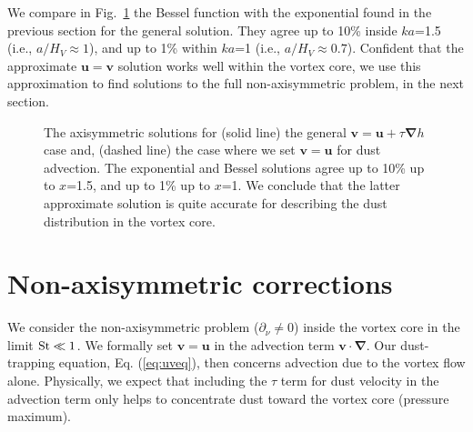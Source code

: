 \documentclass[apj]{emulateapj}
\renewcommand{\v}[1]{{\boldsymbol{#1}}} %
\newcommand{\del}{\v{\nabla}}
\newcommand{\grad}{\del}
\newcommand{\Eq}[1]{Eq. (\ref{#1})}
\newcommand{\eq}[1]{\Eq{#1}}
\newcommand{\Fig}[1]{Fig.~\ref{#1}}
\newcommand{\fig}[1]{\Fig{#1}}
\begin{document}
We compare in \fig{fig:bessel-gaussian} the Bessel function with the exponential found in the
previous section for the general solution. They agree up to 10\% inside
$ka$=1.5 (i.e., $a/H_V\approx 1$), and up to 1\% within $ka$=1 (i.e., $a/H_V\approx 0.7$). Confident that the approximate
$\v{u}=\v{v}$ solution works well within the vortex core, we use this
approximation to find solutions to the full non-axisymmetric problem,
in the next section. 

\begin{figure}
  \begin{center}
  \end{center}
\caption[]{The axisymmetric solutions for (solid line) the general 
$\v{v}=\v{u}+\tau\grad{h}$ case and, (dashed line) the case where
  we set $\v{v}=\v{u}$ for dust advection.
The exponential and Bessel solutions agree up to 10\% up to $x$=1.5, and up 
to 1\% up to $x$=1. We conclude that the latter approximate solution is quite accurate 
for describing the dust distribution in the vortex core.}
 \label{fig:bessel-gaussian}
\end{figure}


\section{Non-axisymmetric corrections}
We consider the non-axisymmetric problem ($\partial_\nu\neq0$) inside
the vortex core in the limit $\rm{St}\ll 1$. We formally set
$\bm{v}=\bm{u}$ in the advection term $\bm{v}\cdot\del$. Our
dust-trapping equation, \eq{eq:uveq}, then concerns advection due to 
the vortex flow alone. Physically, we expect that
including the $\tau$ term for dust velocity in the advection term only
helps to concentrate dust toward the vortex core (pressure maximum).      
\end{document}
